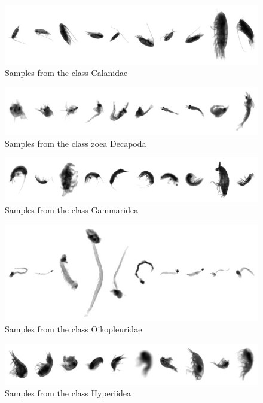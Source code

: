 \begin{figure}[h]
\includegraphics[width=\columnwidth]{collage/006_Calanidae.jpg}\caption{Samples from the class Calanidae }
\end{figure}
\begin{figure}[h]
\includegraphics[width=\columnwidth]{collage/007_zoea__Decapoda.jpg}\caption{Samples from the class zoea  Decapoda }
\end{figure}
\begin{figure}[h]
\includegraphics[width=\columnwidth]{collage/008_Gammaridea.jpg}\caption{Samples from the class Gammaridea }
\end{figure}
\begin{figure}[h]
\includegraphics[width=\columnwidth]{collage/009_Oikopleuridae.jpg}\caption{Samples from the class Oikopleuridae }
\end{figure}
\begin{figure}[h]
\includegraphics[width=\columnwidth]{collage/010_Hyperiidea.jpg}\caption{Samples from the class Hyperiidea }
\end{figure}
